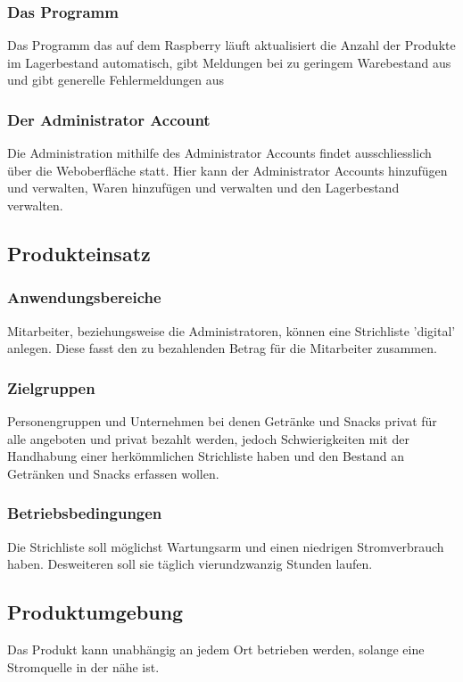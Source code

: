 \documentclass[11pt,a4paper]{article} %
\begin{document}
\subsubsection{Das Programm}
Das Programm das auf dem Raspberry l\"auft aktualisiert die Anzahl der Produkte im Lagerbestand automatisch, gibt Meldungen bei zu geringem Warebestand aus und gibt generelle Fehlermeldungen aus

\subsubsection{Der Administrator Account}
Die Administration mithilfe des Administrator Accounts findet ausschliesslich über die Weboberfl\"ache statt. Hier kann der Administrator Accounts hinzuf\"ugen und verwalten, Waren hinzuf\"ugen und verwalten und den Lagerbestand verwalten.

\subsection{Produkteinsatz}
\subsubsection{Anwendungsbereiche}
Mitarbeiter, beziehungsweise die Administratoren, k\"onnen eine Strichliste 'digital' anlegen. Diese fasst den zu bezahlenden Betrag f\"ur die Mitarbeiter zusammen.

\subsubsection{Zielgruppen}
Personengruppen und Unternehmen bei denen Getr\"anke und Snacks privat f\"ur alle angeboten und privat bezahlt werden, jedoch Schwierigkeiten mit der Handhabung einer herk\"ommlichen Strichliste haben und den Bestand an Getr\"anken und Snacks erfassen wollen.

\subsubsection{Betriebsbedingungen}
Die Strichliste soll m\"oglichst Wartungsarm und einen niedrigen Stromverbrauch haben. Desweiteren soll sie t\"aglich vierundzwanzig Stunden laufen.

\subsection{Produktumgebung}
Das Produkt kann unabh\"angig an jedem Ort betrieben werden, solange eine Stromquelle in der n\"ahe ist.
\end{document}

